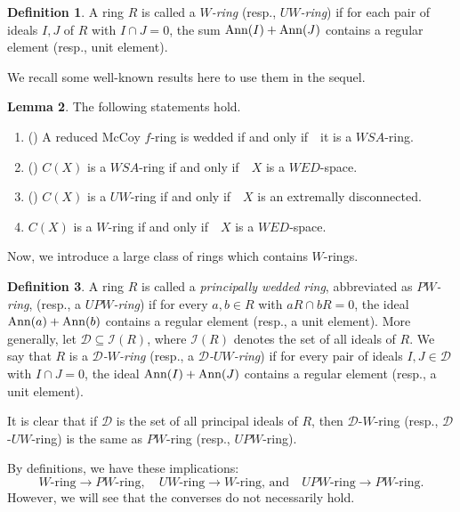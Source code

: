 \documentclass{amsart}
\theoremstyle{definition}
\theoremstyle{remark}
\numberwithin{equation}{section}
\newcommand{\CD}{\mathcal{D}}
\newcommand{\Ann}{{\rm Ann}}
\def\ifif {if and only if\ \ }
\theoremstyle{definition}\newtheorem{thm}{Theorem}[section]
\theoremstyle{definition}\newtheorem{cor}[thm]{Corollary}
\theoremstyle{definition}\newtheorem{lem}[thm]{Lemma}
\theoremstyle{definition}\newtheorem{prop}[thm]{Proposition}
\theoremstyle{definition}\newtheorem{defn}[thm]{Definition}
\theoremstyle{definition}\newtheorem{Rem}[thm]{Remark}
\theoremstyle{remark}\newtheorem{rem}[thm]{Remark}
\theoremstyle{definition}\newtheorem{exam}[thm]{Example}
\theoremstyle{definition}\newtheorem{qu}[thm]{question}
\begin{document}
\begin{defn}
  A ring $R$ is called a \emph{$W$-ring} (resp., \emph{$UW$-ring}) if for each pair of ideals $I, J$ of $R$ with $I\cap J=0$, the sum $\Ann(I)+\Ann(J)$ contains a regular element (resp., unit element).
\end{defn}
We recall some well-known results here to use them in the sequel.
\begin{lem}\label{nem}
The following statements hold.
\begin{enumerate}
\item (\cite[Theorem 4.12]{DT}) A reduced McCoy $f$-ring is wedded \ifif it is a $WSA$-ring.

\item (\cite[Theorem 3.8]{AT}) $C(X)$ is a $WSA$-ring \ifif $X$ is a $WED$-space.

\item (\cite[Corllary 2.13]{T}) $C(X)$ is a $UW$-ring \ifif $X$ is an extremally disconnected.

\item $C(X)$  is a $W$-ring \ifif $X$ is a $WED$-space.
\end{enumerate}
\end{lem}
 \vspace{3mm}

Now, we introduce a large class of rings which contains $W$-rings.
 
\begin{defn}
A ring $R$ is called a \emph{principally wedded ring}, abbreviated as \emph{$PW$-ring}, (resp., a \emph{$UPW$-ring}) if for every $a,b \in R$ with $aR \cap bR = 0$, the ideal $\Ann(a) + \Ann(b)$ contains a regular element (resp., a unit element).  
More generally, let $\mathcal{D} \subseteq \mathcal{I}(R)$, where $\mathcal{I}(R)$ denotes the set of all ideals of $R$. We say that $R$ is a \emph{$\mathcal{D}$-$W$-ring} (resp., a \emph{$\mathcal{D}$-$UW$-ring}) if for every pair of ideals $I,J \in \mathcal{D}$ with $I \cap J = 0$, the ideal $\Ann(I) + \Ann(J)$ contains a regular element (resp., a unit element).
\end{defn}
It is clear that if $\CD$ is the set of all principal ideals of $R$, then $\CD$-$W$-ring (resp., $\CD$-$UW$-ring) is the same as $PW$-ring (resp., $UPW$-ring).

By definitions, we have these implications: \[ W\text{-ring} \to PW\text{-ring},\quad UW\text{-ring} \to W\text{-ring, and}\quad UPW\text{-ring} \to PW\text{-ring}.\] However, we will see that the converses do not necessarily hold.
\end{document}
